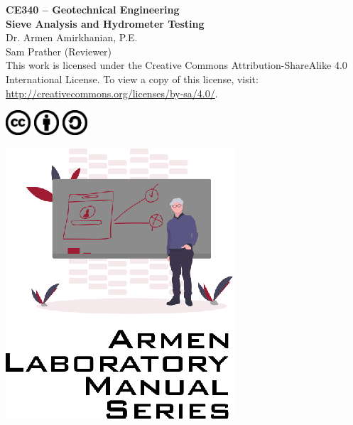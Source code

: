\documentclass[12pt]{article}
\newcommand{\CourseNum}{CE340}
\newcommand{\CourseName}{Geotechnical Engineering}
\newcommand{\LabTitle}{Sieve Analysis and Hydrometer Testing}
\begin{document}
\begin{titlepage}
\begin{flushright}
\LARGE{\textbf{\CourseNum{} -- \CourseName}}\\
\vfill
\Huge{\textbf{\LabTitle}}\\
    \vfill
    \large Dr. Armen Amirkhanian, P.E.\\
    \normalsize Sam Prather (Reviewer)\\
\vfill
\normalsize This work is licensed under the Creative Commons Attribution-ShareAlike 4.0 International License. To view a copy of this license, visit:
\href{http://creativecommons.org/licenses/by-sa/4.0/}{http://creativecommons.org/licenses/by-sa/4.0/}.

\includegraphics[width=0.07\textwidth]{cc.eps}
\includegraphics[width=0.07\textwidth]{by.eps}
\includegraphics[width=0.07\textwidth]{sa.eps}
\vfill

\includegraphics[width=0.3\linewidth]{Logo.eps}\\ 
 
  
\end{flushright}
\end{titlepage}
\end{document}
